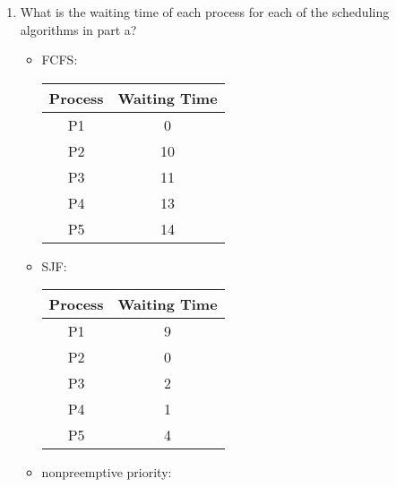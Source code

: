 \begin{enumerate}
\begin{enumerate}
\begin{itemize}
        \end{itemize}
        
        \item What is the waiting time of each process for each of the scheduling algorithms in part a?
        
        \begin{itemize}
            \item FCFS:
            
            \begin{center}
            \begin{tabular}{|c|c|}
                \hline
                Process & Waiting Time \\
                \hline
                P1 & 0 \\
                \hline
                P2 & 10 \\
                \hline
                P3 & 11 \\
                \hline
                P4 & 13 \\
                \hline
                P5 & 14 \\
                \hline
            \end{tabular}
            \end{center}

            \item SJF:

            \begin{center}
            \begin{tabular}{|c|c|}
                \hline
                Process & Waiting Time \\
                \hline
                P1 & 9 \\
                \hline
                P2 & 0 \\
                \hline
                P3 & 2 \\
                \hline
                P4 & 1 \\
                \hline
                P5 & 4 \\
                \hline
            \end{tabular}
            \end{center}
            
            \item nonpreemptive priority:
            

\end{itemize}
\end{enumerate}
\end{enumerate}
